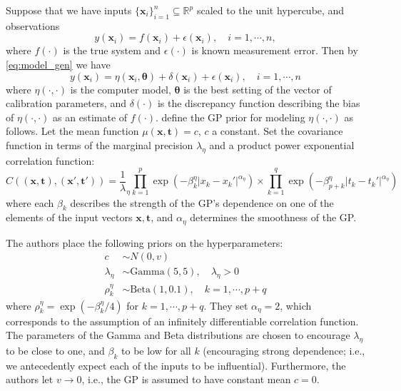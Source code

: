 \documentclass{article}
\begin{document}
Suppose that we have inputs $\{\mathbf x_i\}_{i=1}^n\subseteq \mathbb R^p$ scaled to the unit hypercube, and observations 
%
\begin{equation}\label{eq:2}
y(\mathbf x_i) = f(\mathbf x_i) + \epsilon(\mathbf x_i),\quad i=1,\cdots,n,
\end{equation}
%
where $f(\cdot)$ is the true system and $\epsilon(\cdot)$ is known measurement error. 
%
Then by \eqref{eq:model_gen} we have
%
\begin{equation}\label{eq:2}
y(\mathbf x_i) = \eta(\mathbf x_i,\boldsymbol \theta) + \delta(\mathbf x_i) + \epsilon(\mathbf x_i),\quad i=1,\cdots,n
\end{equation}
%
where $\eta(\cdot,\cdot)$ is the computer model, $\boldsymbol \theta$ is the best%
setting of the vector of calibration parameters, and $\delta(\cdot)$ is the discrepancy function describing the bias of $\eta(\cdot,\cdot)$ as an estimate of $f(\cdot)$.
\citeauthor*{Williams2006} define the GP prior for modeling $\eta(\cdot,\cdot)$ as follows. 
%
Let the mean function $\mu(\mathbf x,\mathbf t)=c$, $c$ a constant. 
%
Set the covariance function in terms of the marginal precision $\lambda_\eta$ and a product power exponential correlation function:
%
\begin{equation}\label{eq:Hig_cov}
C((\mathbf x,\mathbf t),(\mathbf x',\mathbf t')) = \frac 1\lambda_\eta \prod_{k=1}^{p}
\exp \left(-\beta^\eta_k|x_k-x_k'|^{\alpha_\eta}\right) \times
\prod_{k=1}^{q}
\exp \left(-\beta^\eta_{p+k}|t_k-t_k'|^{\alpha_\eta}\right)
\end{equation}
%
where each $\beta_k$ describes the strength of the GP's dependence on one of the elements of the input vectors $\mathbf x,\mathbf t$, and $\alpha_\eta$ determines the smoothness of the GP. 

The authors place the following priors on the hyperparameters:
%
\begin{equation}
\begin{aligned}
c&\sim N(0,v)\\
\lambda_\eta&\sim \mathrm{Gamma}(5,5),\quad\lambda_\eta>0\\
\rho_k^\eta &\sim \mathrm{Beta}(1,0.1),\quad k=1,\cdots,p+q
\end{aligned}
\end{equation}
%
where $\rho_k^\eta=\exp(-\beta_k^\eta/4)$ for $k=1,\cdots,p+q$. 
%
They set $\alpha_\eta=2$, which corresponds to the assumption of an infinitely differentiable correlation function. 
%
The parameters of the Gamma and Beta distributions are chosen to encourage $\lambda_\eta$ to be close to one, and $\beta_k$ to be low for all $k$ (encouraging strong dependence; i.e., we antecedently expect each of the inputs to be influential). 
%
Furthermore, the authors let $v\to0$, i.e., the GP is assumed to have constant mean $c=0$.
\end{document}
